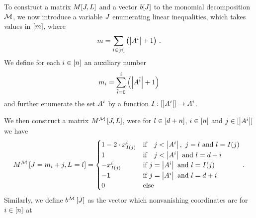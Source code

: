 To construct a matrix $M[J,L]$ and a vector $b[J]$ to the monomial decomposition $\mathcal{M}$, we now introduce a variable $J$ enumerating linear inequalities, which takes values in $[m]$, where
\[ m =  \sum_{i\in[n]} \left(\left|A^{i}\right| +1\right) \, . \]
We define for each $i\in[n]$ an auxiliary number
\[ m_{i} = \sum_{\tilde{i}=0}^{i} \left(\left|A^{\tilde{i}}\right| +1\right) \]
and further enumerate the set $A^{i}$ by a function $I: [\left|A^{i}\right|] \rightarrow A^{i}$.

We then construct a matrix $M^{\mathcal{M}}\left[J,L\right]$, were for $l\in[d+n]$, $i\in[n]$ and $j\in[\left|A^{i}\right|]$ we have
\begin{align}
    \label{eq:ilpMatrix}
    \matrixofat{\sliceset}{\datvariable=\datanum_{\decindex}+\datindex,\indexedselvariable} =
    \begin{cases}
        1 - 2 \cdot \catindexof{\indexinterpretationat{\datindex}}^{\decindex} & \text{if} \quad \datindex < \cardof{\variablesetof{\decindex}}, \,\, \datindex=\selindex \text{  and  } \selindex = \indexinterpretationat{\datindex} \\ %
        1  & \text{if} \quad \datindex < \cardof{\variablesetof{\decindex}} \text{  and  } \selindex = \catorder + \decindex \\ %
        -\catindexof{\indexinterpretationat{\datindex}}^{\decindex} & \text{if }  \datindex = \cardof{\variablesetof{\decindex}}    \text{ and }  \selindex=\indexinterpretationat{\datindex}  \\ %
        -1 & \text{if }  \datindex = \cardof{\variablesetof{\decindex}}  \text{ and }  \selindex = \catorder + \decindex \\ %
        0 & \text{else} \\
    \end{cases} \, .
\end{align}
Similarly, we define $b^{\mathcal{M}}\left[J\right]$ as the vector which nonvanishing coordinates are for $i\in[n]$ at
